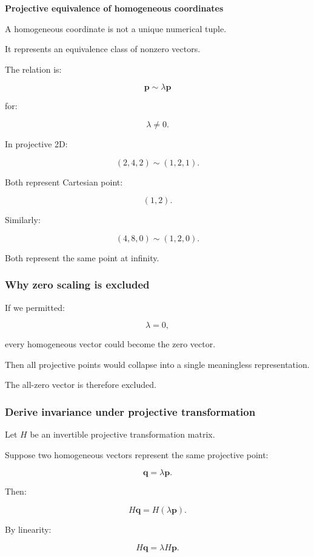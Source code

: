 \textbf{Projective equivalence of homogeneous coordinates}

A homogeneous coordinate is not a unique numerical tuple.

It represents an equivalence class of nonzero vectors.

The relation is:

\[
 \boxed{ \mathbf p\sim\lambda\mathbf p }
\]

for:

\[
 \lambda\ne0.
\]

In projective 2D:

\[
 (2,4,2)\sim(1,2,1).
\]

Both represent Cartesian point:

\[
 (1,2).
\]

Similarly:

\[
 (4,8,0)\sim(1,2,0).
\]

Both represent the same point at infinity.

\subsubsection{Why zero scaling is excluded}\label{02-foundations-ii-ch032-why-zero-scaling-is-excluded}

If we permitted:

\[
 \lambda=0,
\]

every homogeneous vector could become the zero vector.

Then all projective points would collapse into a single meaningless representation.

The all-zero vector is therefore excluded.

\subsubsection{Derive invariance under projective transformation}\label{02-foundations-ii-ch032-derive-invariance-under-projective-transformation}

Let \(H\) be an invertible projective transformation matrix.

Suppose two homogeneous vectors represent the same projective point:

\[
 \mathbf q=\lambda\mathbf p.
\]

Then:

\[
 H\mathbf q=H(\lambda\mathbf p).
\]

By linearity:

\[
 H\mathbf q=\lambda H\mathbf p.
\]

